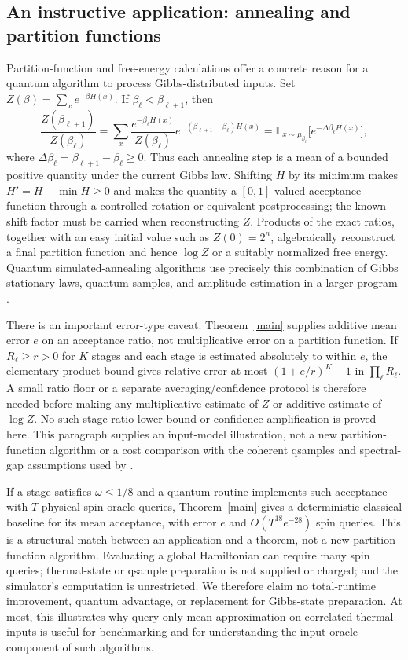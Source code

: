 \documentclass[11pt]{article}
\theoremstyle{definition}\newtheorem{definition}[theorem]{Definition}
\theoremstyle{remark}\newtheorem{remark}[theorem]{Remark}
\newcommand{\E}{\mathbb E}\newcommand{\Prb}{\mathbb P}
\begin{document}
\subsection{An instructive application: annealing and partition functions}
Partition-function and free-energy calculations offer a concrete reason for a quantum algorithm to process Gibbs-distributed inputs. Set \(Z(\beta)=\sum_xe^{-\beta H(x)}\). If \(\beta_\ell<\beta_{\ell+1}\), then
\[
 \frac{Z(\beta_{\ell+1})}{Z(\beta_\ell)}
 =\sum_x\frac{e^{-\beta_\ell H(x)}}{Z(\beta_\ell)}e^{-(\beta_{\ell+1}-\beta_\ell)H(x)}
 =\E_{x\sim\mu_{\beta_\ell}}\bigl[e^{-\Delta\beta_\ell H(x)}\bigr],
\]
where \(\Delta\beta_\ell=\beta_{\ell+1}-\beta_\ell\ge0\). Thus each annealing step is a mean of a bounded positive quantity under the current Gibbs law. Shifting \(H\) by its minimum makes \(H'=H-\min H\ge0\) and makes the quantity a \([0,1]\)-valued acceptance function through a controlled rotation or equivalent postprocessing; the known shift factor must be carried when reconstructing \(Z\). Products of the exact ratios, together with an easy initial value such as \(Z(0)=2^n\), algebraically reconstruct a final partition function and hence \(\log Z\) or a suitably normalized free energy. Quantum simulated-annealing algorithms use precisely this combination of Gibbs stationary laws, quantum samples, and amplitude estimation in a larger program \cite{HW20}.

There is an important error-type caveat. Theorem~\ref{main} supplies additive mean error \(e\) on an acceptance ratio, not multiplicative error on a partition function. If \(R_\ell\ge r>0\) for \(K\) stages and each stage is estimated absolutely to within \(e\), the elementary product bound gives relative error at most \((1+e/r)^K-1\) in \(\prod_\ell R_\ell\). A small ratio floor or a separate averaging/confidence protocol is therefore needed before making any multiplicative estimate of \(Z\) or additive estimate of \(\log Z\). No such stage-ratio lower bound or confidence amplification is proved here. This paragraph supplies an input-model illustration, not a new partition-function algorithm or a cost comparison with the coherent qsamples and spectral-gap assumptions used by \cite{HW20}.

If a stage satisfies \(\omega\le1/8\) and a quantum routine implements such acceptance with \(T\) physical-spin oracle queries, Theorem~\ref{main} gives a deterministic classical baseline for its mean acceptance, with error \(e\) and \(O(T^{18}e^{-28})\) spin queries. This is a structural match between an application and a theorem, not a new partition-function algorithm. Evaluating a global Hamiltonian can require many spin queries; thermal-state or qsample preparation is not supplied or charged; and the simulator's computation is unrestricted. We therefore claim no total-runtime improvement, quantum advantage, or replacement for Gibbs-state preparation. At most, this illustrates why query-only mean approximation on correlated thermal inputs is useful for benchmarking and for understanding the input-oracle component of such algorithms.
\end{document}

